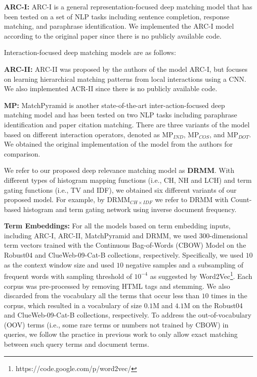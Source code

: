 \documentclass{sig-alternate-05-2015}
\begin{document}
\textbf{ARC-I:} ARC-I \cite{hu2014convolutional} is a general representation-focused deep matching model that has been tested on a set of NLP tasks including sentence completion, response matching, and paraphrase identification. We implemented the ARC-I model according to the original paper since there is no publicly available code.

Interaction-focused deep matching models are as follows:

\textbf{ARC-II:} ARC-II \cite{hu2014convolutional} was proposed by the authors of the model ARC-I, but focuses on learning hierarchical matching patterns from local interactions using a CNN. We also implemented ACR-II since there is no publicly available code.

\textbf{MP:} MatchPyramid \cite{pang2016text} is another state-of-the-art inter-action-focused deep matching model and has been tested on two NLP tasks including paraphrase identification and paper citation matching. There are three variants of the model based on different interaction operators, denoted as MP$_{IND}$, MP$_{COS}$, and MP$_{DOT}$. We obtained the original implementation of the model from the authors for comparison. 

We refer to our proposed deep relevance matching model as \textbf{DRMM}. With different types of histogram mapping functions (i.e., CH, NH and LCH) and term gating functions (i.e., TV and IDF), we obtained six different variants of our proposed model. For example, by DRMM$_{CH\times IDF}$ we refer to DRMM with Count-based histogram and term gating network using inverse document frequency.


\textbf{Term Embeddings:} For all the models based on term embedding inputs, including ARC-I, ARC-II, MatchPyramid and DRMM, we used $300$-dimensional term vectors trained with the Continuous Bag-of-Words (CBOW) Model \cite{mikolov2013distributed} on the Robust04 and ClueWeb-09-Cat-B collections, respectively. Specifically, we used $10$ as the context window size and used $10$ negative samples and a subsampling of frequent words with sampling threshold of $10^{-4}$ as suggested by Word2Vec\footnote{https://code.google.com/p/word2vec/}. Each corpus was pre-processed by removing HTML tags and stemming. We also discarded from the vocabulary all the terms that occur less than $10$ times in the corpus, which resulted in a vocabulary of size $0.1$M and $4.1$M on the Robust04 and ClueWeb-09-Cat-B collections, respectively. To address the out-of-vocabulary (OOV) terms (i.e., some rare terms or numbers not trained by CBOW) in queries, we follow the practice in previous work \cite{kenter2015short} to only allow exact matching between such query terms and document terms.
\end{document}
